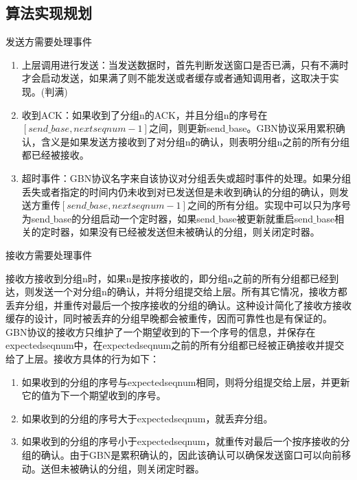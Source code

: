 \documentclass[UTF8,14pt]{article}
\numberwithin{figure}{section}
\begin{document}
\subsection{算法实现规划}
发送方需要处理事件
\begin{enumerate}
      \setlength{\parskip}{-5mm}
      \item 上层调用进行发送：当发送数据时，首先判断发送窗口是否已满，只有不满时才会启动发送，如果满了则不能发送或者缓存或者通知调用者，这取决于实现。(判满)\\
      \item 收到ACK：如果收到了分组n的ACK，并且分组n的序号在$[send\_{}base,  nextseqnum - 1]$之间，则更新send$\_$base。GBN协议采用累积确认，含义是如果发送方接收到了对分组n的确认，则表明分组n之前的所有分组都已经被接收。\\
      \item 超时事件：GBN协议名字来自该协议对分组丢失或超时事件的处理。如果分组丢失或者指定的时间内仍未收到对已发送但是未收到确认的分组的确认，则发送方重传$[send\_{}base, nextseqnum-1]$之间的所有分组。实现中可以只为序号为send$\_{}$base的分组启动一个定时器，如果send$\_{}$base被更新就重启send$\_{}$base相关的定时器，如果没有已经被发送但未被确认的分组，则关闭定时器。
\end{enumerate}
\vspace{0.8cm}

接收方需要处理事件

接收方接收到分组n时，如果n是按序接收的，即分组n之前的所有分组都已经到达，则发送一个对分组n的确认，并将分组提交给上层。所有其它情况，接收方都丢弃分组，并重传对最后一个按序接收的分组的确认。这种设计简化了接收方接收缓存的设计，同时被丢弃的分组早晚都会被重传，因而可靠性也是有保证的。
GBN协议的接收方只维护了一个期望收到的下一个序号的信息，并保存在expectedseqnum中，在expectedseqnum之前的所有分组都已经被正确接收并提交给了上层。接收方具体的行为如下：
\begin{enumerate}
      \setlength{\parskip}{-5mm}
      \item 如果收到的分组的序号与expectedseqnum相同，则将分组提交给上层，并更新它的值为下一个期望收到的序号。\\
      \item 如果收到的分组的序号大于expectedseqnum，就丢弃分组。\\
      \item 如果收到的分组的序号小于expectedseqnum，就重传对最后一个按序接收的分组的确认。由于GBN是累积确认的，因此该确认可以确保发送窗口可以向前移动。送但未被确认的分组，则关闭定时器。
\end{enumerate}
\end{document}
